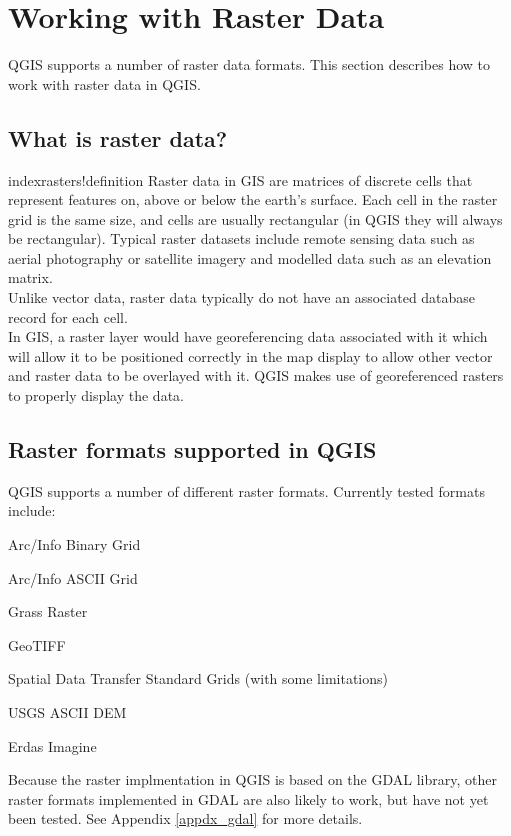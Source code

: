 \section{Working with Raster Data}
QGIS supports a number of raster data formats. This section describes how to work with raster data in QGIS.
\subsection{What is raster data?}
index{rasters!definition}
Raster data in GIS are matrices of discrete cells that represent features on, above or below the earth's surface. Each cell in the raster grid is the same size, and cells are usually rectangular (in QGIS they will always be rectangular). Typical raster datasets include remote sensing data such as aerial photography or satellite imagery and modelled data such as an elevation matrix.\\

Unlike vector data, raster data typically do not have an associated database record for each cell.\\

In GIS, a raster layer would have georeferencing data associated with it which
will allow it to be positioned correctly in the map display to allow other
vector and raster data to be overlayed with it. QGIS makes use of georeferenced
rasters to properly display the data.
	
\subsection{Raster formats supported in QGIS}
QGIS supports a number of different raster formats. Currently tested formats
include:
\begin{compactitem}
\item Arc/Info Binary Grid
\item Arc/Info ASCII Grid
\item Grass Raster
\item GeoTIFF
\item Spatial Data Transfer Standard Grids (with some limitations)
\item USGS ASCII DEM
\item Erdas Imagine
\end{compactitem}
Because the raster implmentation in QGIS is based on the GDAL library, other
raster formats implemented in GDAL are also likely to work, but have not yet
been tested. See Appendix \ref{appdx_gdal} for more
details.
	
